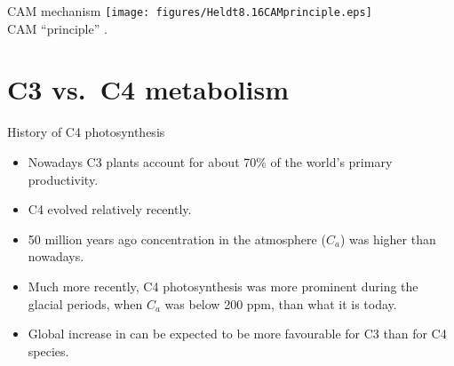 \documentclass[10pt]{beamer}
\begin{document}
\begin{frame}{CAM mechanism}
    \centering
    \texttt{[image: figures/Heldt8.16CAMprinciple.eps]}\\
   {\small CAM ``principle'' \autocite[from][]{Heldt1997}.}
\end{frame}

%

\section{C3 vs.\ C4 metabolism}

\begin{frame}{History of C4 photosynthesis}
    \begin{itemize}
        \item Nowadays C3 plants account for about 70\% of the world's primary
        productivity.
        \item C4 evolved relatively recently.
        \item 50 million years ago \COtwo concentration in the
        atmosphere ($C_a$) was higher than nowadays.
        \item Much more recently, C4 photosynthesis was more prominent during the glacial periods,
        when $C_a$ was below 200 ppm, than what it is today.
        \item Global increase in \COtwo can be expected to be more
        favourable for C3 than for C4 species.
    \end{itemize}
\end{frame}
\end{document}
